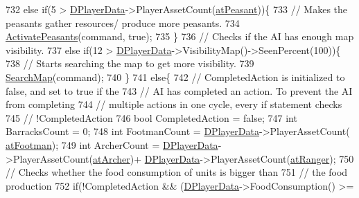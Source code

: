 \begin{DoxyCode}
732         \textcolor{keywordflow}{else} \textcolor{keywordflow}{if}(5 > \hyperlink{classCAIPlayer_a83b5113c8f7e80df54940b647c5ee2e6}{DPlayerData}->PlayerAssetCount(\hyperlink{GameDataTypes_8h_a5600d4fc433b83300308921974477fecaf5e570c7e5a2266810f610e7f945ea61}{atPeasant}))\{
733             \textcolor{comment}{// Makes the peasants gather resources/ produce more peasants.}
734             \hyperlink{classCAIPlayer_a3fab1c955fd68bb53fa80bb1872d2819}{ActivatePeasants}(command, \textcolor{keyword}{true});
735         \}
736         \textcolor{comment}{// Checks if the AI has enough map visibility.}
737         \textcolor{keywordflow}{else} \textcolor{keywordflow}{if}(12 > \hyperlink{classCAIPlayer_a83b5113c8f7e80df54940b647c5ee2e6}{DPlayerData}->VisibilityMap()->SeenPercent(100))\{
738             \textcolor{comment}{// Starts searching the map to get more visibility.}
739             \hyperlink{classCAIPlayer_afafbe8fc589e09a16ae1f02f2794d7b0}{SearchMap}(command);
740         \}
741         \textcolor{keywordflow}{else}\{
742             \textcolor{comment}{// CompletedAction is initialized to false, and set to true if the }
743             \textcolor{comment}{// AI has completed an action. To prevent the AI from completing}
744             \textcolor{comment}{// multiple actions in one cycle, every if statement checks}
745             \textcolor{comment}{// !CompletedAction}
746             \textcolor{keywordtype}{bool} CompletedAction = \textcolor{keyword}{false};
747             \textcolor{keywordtype}{int} BarracksCount = 0;
748             \textcolor{keywordtype}{int} FootmanCount = \hyperlink{classCAIPlayer_a83b5113c8f7e80df54940b647c5ee2e6}{DPlayerData}->PlayerAssetCount(
      \hyperlink{GameDataTypes_8h_a5600d4fc433b83300308921974477fecad586e8ff9ee846d22630c2066e8fb7c2}{atFootman});
749             \textcolor{keywordtype}{int} ArcherCount = \hyperlink{classCAIPlayer_a83b5113c8f7e80df54940b647c5ee2e6}{DPlayerData}->PlayerAssetCount(\hyperlink{GameDataTypes_8h_a5600d4fc433b83300308921974477feca7fad0074234068ff0af4092a75b929f8}{atArcher})+
      \hyperlink{classCAIPlayer_a83b5113c8f7e80df54940b647c5ee2e6}{DPlayerData}->PlayerAssetCount(\hyperlink{GameDataTypes_8h_a5600d4fc433b83300308921974477fecaafd2b1e0ca34872bb06098dbec9939e0}{atRanger});
750             \textcolor{comment}{// Checks whether the food consumption of units is bigger than}
751             \textcolor{comment}{// the food production}
752             \textcolor{keywordflow}{if}(!CompletedAction && (\hyperlink{classCAIPlayer_a83b5113c8f7e80df54940b647c5ee2e6}{DPlayerData}->FoodConsumption() >= 

\end{DoxyCode}
